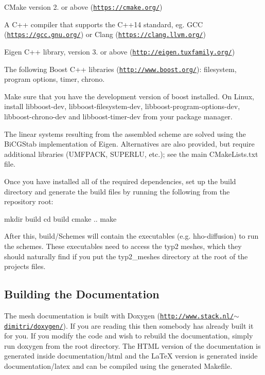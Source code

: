 \begin{DoxyItemize}
\item C\+Make version 2. or above (\href{https://cmake.org/}{\tt https\+://cmake.\+org/})
\item A C++ compiler that supports the C++14 standard, eg. G\+CC (\href{https://gcc.gnu.org/}{\tt https\+://gcc.\+gnu.\+org/}) or Clang (\href{https://clang.llvm.org/}{\tt https\+://clang.\+llvm.\+org/})
\item Eigen C++ library, version 3. or above (\href{http://eigen.tuxfamily.org/}{\tt http\+://eigen.\+tuxfamily.\+org/})
\item The following Boost C++ libraries (\href{http://www.boost.org/}{\tt http\+://www.\+boost.\+org/})\+: filesystem, program options, timer, chrono.
\end{DoxyItemize}

Make sure that you have the development version of boost installed. On Linux, install {\ttfamily libboost-\/dev}, {\ttfamily libboost-\/filesystem-\/dev}, {\ttfamily libboost-\/program-\/options-\/dev}, {\ttfamily libboost-\/chrono-\/dev} and {\ttfamily libboost-\/timer-\/dev} from your package manager.

The linear systems resulting from the assembled scheme are solved using the Bi\+C\+G\+Stab implementation of Eigen. Alternatives are also provided, but require additional libraries (U\+M\+F\+P\+A\+CK, S\+U\+P\+E\+R\+LU, etc.); see the main C\+Make\+Lists.\+txt file.

Once you have installed all of the required dependencies, set up the build directory and generate the build files by running the following from the repository root\+:


\begin{DoxyCode}
mkdir build
cd build
cmake ..
make
\end{DoxyCode}


After this, {\ttfamily build/\+Schemes} will contain the executables (e.\+g. {\ttfamily hho-\/diffusion}) to run the schemes. These executables need to access the typ2 meshes, which they should naturally find if you put the {\ttfamily typ2\+\_\+meshes} directory at the root of the project\textquotesingle{}s files.\hypertarget{index_doco}{}\subsection{Building the Documentation}\label{index_doco}
The mesh documentation is built with Doxygen (\href{http://www.stack.nl/~dimitri/doxygen/}{\tt http\+://www.\+stack.\+nl/$\sim$dimitri/doxygen/}). If you are reading this then somebody has already built it for you. If you modify the code and wish to rebuild the documentation, simply run {\ttfamily doxygen} from the root directory. The H\+T\+ML version of the documentation is generated inside {\ttfamily documentation/html} and the La\+TeX version is generated inside {\ttfamily documentation/latex} and can be compiled using the generated Makefile.


